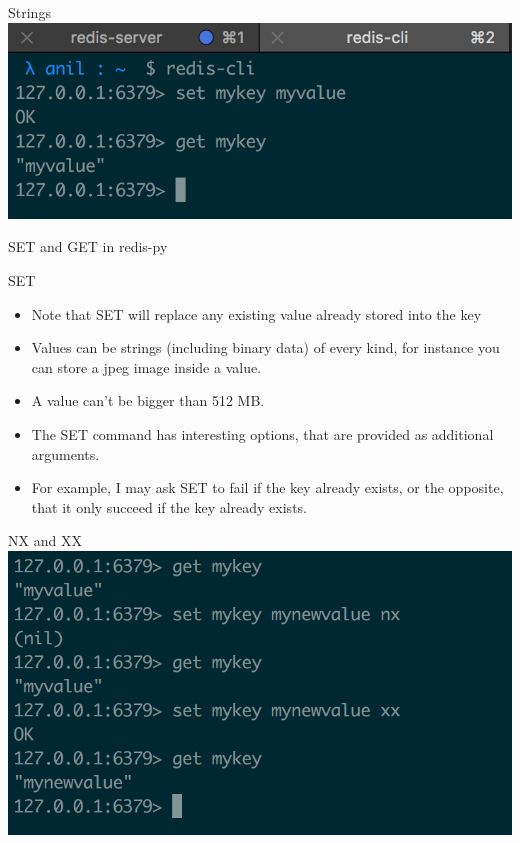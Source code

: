 \documentclass[10pt]{beamer}
\begin{document}
\begin{frame}[fragile]{Strings}
  \includegraphics[scale=0.9]{img/redis-basic-set-get}
\end{frame}

\begin{frame}[fragile]{SET and GET in redis-py}
\end{frame}

\begin{frame}[fragile]{SET}
  \begin{itemize}
    \item Note that SET will replace any existing value already stored into
    the key
    \item Values can be strings (including binary data) of every kind, for
    instance you can store a jpeg image inside a value.
    \item A value can't be bigger than 512 MB.
    \item The SET command has interesting options, that are provided as
    additional arguments.
    \item For example, I may ask SET to fail if the key already exists, or the
    opposite, that it only succeed if the key already exists.
  \end{itemize}
\end{frame}

\begin{frame}[fragile]{NX and XX}
  \includegraphics[scale=0.9]{img/set-get-advanced}
\end{frame}
\end{document}
